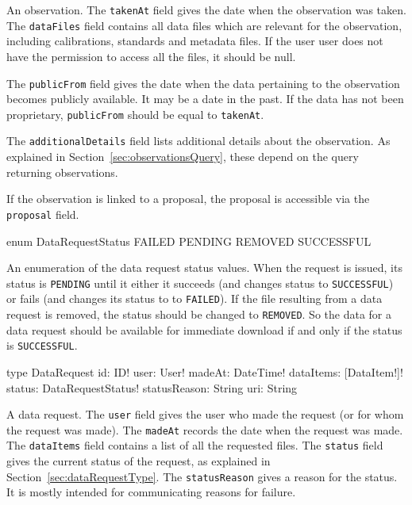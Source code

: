 An observation. The \verb|takenAt| field gives the date when the observation was taken. The \verb|dataFiles| field contains all data files which are relevant for the observation, including calibrations, standards and metadata files. If the user user does not have the permission to access all the files, it should be null.

The \verb|publicFrom| field gives the date when the data pertaining to the observation becomes publicly available. It may be a date in the past. If the data has not been proprietary, \verb|publicFrom| should be equal to \verb|takenAt|.

The \verb|additionalDetails| field lists additional details about the observation. As explained in Section~\ref{sec:observationsQuery}, these depend on the query returning observations.

If the observation is linked to a proposal, the proposal is accessible via the \verb|proposal| field.

\label{sec:dataRequestType}

\begin{code}
enum DataRequestStatus {
  FAILED
  PENDING
  REMOVED
  SUCCESSFUL
}
\end{code}

An enumeration of the data request status values. When the request is issued, its status is \verb|PENDING| until it either it succeeds (and changes status to \verb|SUCCESSFUL|) or fails (and changes its status to to \verb|FAILED|). If the file resulting from a data request is removed, the status should be changed to \verb|REMOVED|. So the data for a data request should be available for immediate download if and only if the status is \verb|SUCCESSFUL|.


\begin{code}
type DataRequest {
  id: ID!
  user: User!
  madeAt: DateTime!
  dataItems: [DataItem!]!
  status: DataRequestStatus!
  statusReason: String
  uri: String
}
\end{code}

A data request. The \verb|user| field gives the user who made the request (or for whom the request was made). The \verb|madeAt| records the date when the request was made. The \verb|dataItems| field contains a list of all the requested files. The \verb|status| field gives the current status of the request, as explained in Section~\ref{sec:dataRequestType}. The \verb|statusReason| gives a reason for the status. It is mostly intended for communicating reasons for failure.

